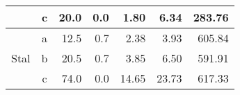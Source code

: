 \begin{table}[H]
{\begin{tabular}{|c|c|r|r|r|r|r|}
                                                                                                     & c        & 20.0                                                                               & 0.0                                                                                   & 1.80                                                                              & 6.34                                                                                        & 283.76                                                                        \\ \hline
    \multirow{3}{*}{Stal}                                                                            & a        & 12.5                                                                               & 0.7                                                                                   & 2.38                                                                              & 3.93                                                                                        & 605.84                                                                        \\ \cline{2-7} 
                                                                                                     & b        & 20.5                                                                               & 0.7                                                                                   & 3.85                                                                              & 6.50                                                                                        & 591.91                                                                        \\ \cline{2-7} 
                                                                                                     & c        & 74.0                                                                               & 0.0                                                                                   & 14.65                                                                             & 23.73                                                                                       & 617.33                                                                        \\ \hline
    \end{tabular}%
    }
    \end{table}